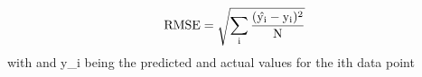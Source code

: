 $$\rm{RMSE}=\sqrt{\sum\limits_{i}\frac{(\hat{y_i}-y_i)^2}{N}}$$
with  and y_i being the predicted and actual values for the ith data point
